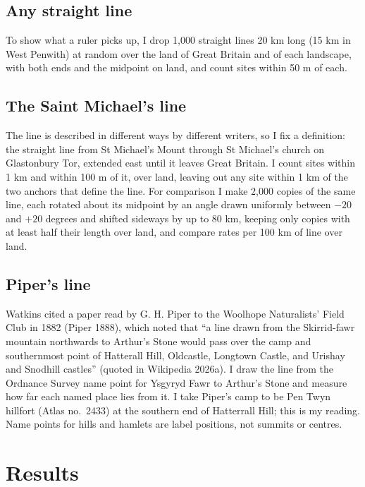 \documentclass[11pt,a4paper]{article}
\begin{document}
\subsection{Any straight line}

To show what a ruler picks up, I drop 1,000 straight lines 20 km long (15 km in West Penwith) at random over the land of Great Britain and of each landscape, with both ends and the midpoint on land, and count sites within 50 m of each.

\subsection{The Saint Michael's line}

The line is described in different ways by different writers, so I fix a definition: the straight line from St Michael's Mount through St Michael's church on Glastonbury Tor, extended east until it leaves Great Britain. I count sites within 1 km and within 100 m of it, over land, leaving out any site within 1 km of the two anchors that define the line. For comparison I make 2,000 copies of the same line, each rotated about its midpoint by an angle drawn uniformly between $-20$ and $+20$ degrees and shifted sideways by up to 80 km, keeping only copies with at least half their length over land, and compare rates per 100 km of line over land.

\subsection{Piper's line}

Watkins cited a paper read by G. H. Piper to the Woolhope Naturalists' Field Club in 1882 (Piper 1888), which noted that ``a line drawn from the Skirrid-fawr mountain northwards to Arthur's Stone would pass over the camp and southernmost point of Hatterall Hill, Oldcastle, Longtown Castle, and Urishay and Snodhill castles'' (quoted in Wikipedia 2026a). I draw the line from the Ordnance Survey name point for Ysgyryd Fawr to Arthur's Stone and measure how far each named place lies from it. I take Piper's camp to be Pen Twyn hillfort (Atlas no.\ 2433) at the southern end of Hatterrall Hill; this is my reading. Name points for hills and hamlets are label positions, not summits or centres.

\section{Results}
\end{document}
